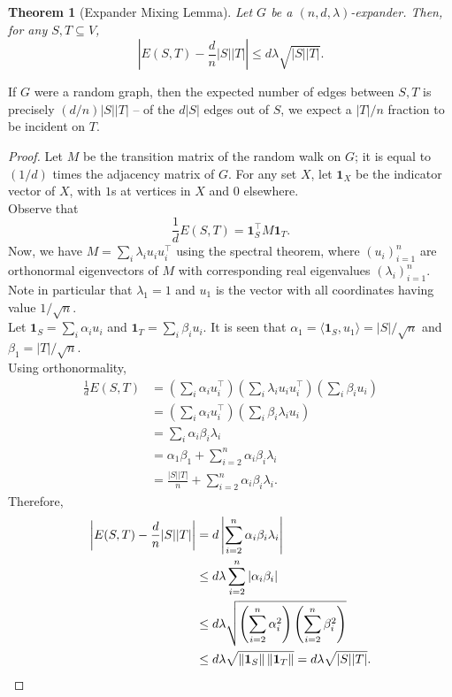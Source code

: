 \documentclass{article}
\newcounter{lecnum}
\newtheorem{theorem}{Theorem}[lecnum]
\newcommand{\indic}{\mathbf{1}}
\newcommand{\norm}[1]{\left\|#1\right\|}
\begin{document}
	\begin{theorem}[Expander Mixing Lemma]
		Let $G$ be a $(n,d,\lambda)$-expander. Then, for any $S,T \subseteq V$,
		\[ \left| E(S,T) - \frac{d}{n}|S||T| \right| \le d\lambda \sqrt{|S||T|}. \]
	\end{theorem}
	If $G$ were a random graph, then the expected number of edges between $S,T$ is precisely $(d/n)|S||T|$ -- of the $d|S|$ edges out of $S$, we expect a $|T|/n$ fraction to be incident on $T$.
	\begin{proof}
		Let $M$ be the transition matrix of the random walk on $G$; it is equal to $(1/d)$ times the adjacency matrix of $G$. For any set $X$, let $\indic_X$ be the indicator vector of $X$, with $1$s at vertices in $X$ and $0$ elsewhere.\\
		Observe that
		\[ \frac{1}{d}E(S,T) = \indic_S^\top M \indic_T. \]
		Now, we have $M = \sum_i \lambda_i u_i u_i^\top$ using the spectral theorem, where $(u_i)_{i=1}^n$ are orthonormal eigenvectors of $M$ with corresponding real eigenvalues $(\lambda_i)_{i=1}^n$. Note in particular that $\lambda_1 = 1$ and $u_1$ is the vector with all coordinates having value $1/\sqrt{n}$.\\
		Let $\indic_S = \sum_i \alpha_i u_i$ and $\indic_T = \sum_i \beta_i u_i$. It is seen that $\alpha_1 = \langle\indic_S,u_1\rangle = |S|/\sqrt{n}$ and $\beta_1 = |T|/\sqrt{n}$. \\
		Using orthonormality,
		\begin{align*}
			\frac{1}{d}E(S,T) &= \left( \sum_i \alpha_i u_i^\top \right) \left( \sum_i \lambda_i u_iu_i^\top \right) \left( \sum_i \beta_i u_i \right) \\
				&= \left( \sum_i \alpha_i u_i^\top \right) \left( \sum_i \beta_i\lambda_i u_i \right) \\
				&= \sum_i \alpha_i \beta_i \lambda_i \\
				&= \alpha_1\beta_1 + \sum_{i=2}^n \alpha_i\beta_i \lambda_i \\
				&= \frac{|S||T|}{n} + \sum_{i=2}^n \alpha_i \beta_i \lambda_i.
		\end{align*}
		Therefore,
		\begin{align*}
			\left| E(S,T) - \frac{d}{n} |S||T| \right| &= d\left|\sum_{i=2}^n \alpha_i \beta_i \lambda_i \right| \\
				&\le d\lambda \sum_{i=2}^n \left|\alpha_i \beta_i \right| \\
				&\le d\lambda \sqrt{ \left( \sum_{i=2}^n \alpha_i^2 \right) \left( \sum_{i=2}^n \beta_i^2 \right) } \\
				&\le d\lambda \sqrt{\norm{\indic_S}\norm{\indic_T}} = d\lambda\sqrt{|S||T|}. \qedhere
		\end{align*}
	\end{proof}
\end{document}
